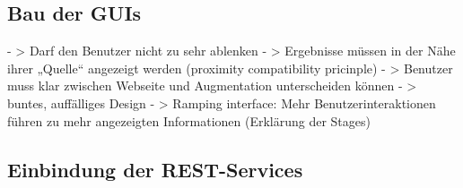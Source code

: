  \subsection{Bau der GUIs}
		- > Darf den Benutzer nicht zu sehr ablenken
		- > Ergebnisse müssen in der Nähe ihrer „Quelle“ angezeigt werden (proximity compatibility pricinple)
		- > Benutzer muss klar zwischen Webseite und Augmentation unterscheiden können
		- > buntes, auffälliges Design
		- > Ramping interface: Mehr Benutzerinteraktionen führen zu mehr angezeigten Informationen (Erklärung der Stages) 
 \subsection{Einbindung der REST-Services}